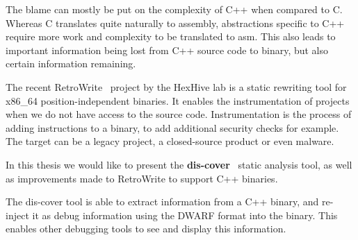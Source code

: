 \documentclass[a4paper,11pt,oneside]{report}
\begin{document}
The blame can mostly be put on the complexity of C++ when compared to C.
Whereas C translates quite naturally to assembly, abstractions specific to C++ 
require more work and complexity to be translated to asm.
This also leads to important information being lost from C++ source code to 
binary, but also certain information remaining.



The recent RetroWrite~\cite{dinesh20oakland} project by the HexHive lab is a 
static rewriting tool for x86\_64 position-independent binaries.
It enables the instrumentation of projects when we do not have access to the 
source code.
Instrumentation is the process of adding instructions to a binary, to add
additional security checks for example.
The target can be a legacy project, a closed-source product or even malware.




In this thesis we would like to present the 
\textbf{dis-cover}~\cite{discovergithub} static analysis tool,
as well as improvements made to RetroWrite to support C++ binaries.



The dis-cover tool is able to extract information from a C++ binary, and 
re-inject it as debug information using the DWARF format into the binary.
This enables other debugging tools to see and display this information.






\end{document}
